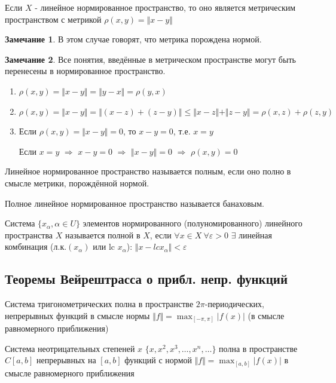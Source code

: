 \documentclass{article}
\theoremstyle{definition}
\numberwithin{theorem}{section}
\numberwithin{lemma}{section}
\numberwithin{definition}{section}
\numberwithin{corollary}{section}
\newtheorem*{remark}{Замечание}
\numberwithin{equation}{section}
\let\epsilon\varepsilon
\let\implies\Rightarrow
\begin{document}
\begin{lemma}
  Если $X$ - линейное нормированное пространство, то оно является
  метрическим пространством с метрикой $\rho(x,y)=\Vert x-y \Vert$
\end{lemma}
\begin{remark}
  В этом случае говорят, что метрика порождена нормой.
\end{remark}
\begin{remark}
  Все понятия, введённые в метрическом пространстве могут быть перенесены в нормированное пространство.
\end{remark}
\begin{definition}
  \phantom{.}

  \begin{enumerate}
    \item $\rho(x,y)=\Vert x-y \Vert=\Vert y-x \Vert=\rho(y,x)$
    \item $\rho(x,y)=\Vert x-y \Vert=\Vert (x-z)+(z-y) \Vert\le \Vert x-z \Vert + \Vert z-y \Vert=\rho(x,z)+\rho(z,y)$
    \item Если $\rho(x,y)=\Vert x-y \Vert=0$, то $x-y=0$, т.е. $x=y$

      Если $x=y$ $\implies$ $x-y=0$ $\implies$ $\Vert x-y \Vert=0$ $\implies $ $\rho(x,y)=0$
  \end{enumerate}
\end{definition}
\begin{definition}
  Линейное нормированное пространство называется полным, если оно полно в смысле
  метрики, порождённой нормой.
\end{definition}
\begin{definition}
  Полное линейное нормированное пространство называется банаховым. 
\end{definition}
\begin{definition}
  Система $\{x_{\alpha}, \alpha \in U\}$ элементов нормированного (полуномированного)
  линейного пространства $X$ называется полной в $X$, если $\forall x \in X\ \forall \epsilon>0$
  $\exists $ линейная комбинация (л.к.$(x_\alpha)$ или lc $x_\alpha$): $\Vert x- lc x_{\alpha}\Vert<\epsilon$
\end{definition}
\subsection{Теоремы Вейрештрасса о прибл. непр. функций}
\begin{theorem}[Т1 с волной]
  Система тригонометрических полна в пространстве $2\pi$-периодических,
  непрерывных функций в смысле нормы $\Vert f \Vert=\max_{[-\pi,\pi]}|f(x)|$
  (в смысле равномерного приближения)
\end{theorem}
\begin{theorem}[Т2 с волной]
  Система неотрицательных степеней $x$ $\{x,x^{2},x^{3},\dots ,x^{n},\dots \}$
  полна в пространстве $C[a,b]$ непрерывных на $[a,b]$ функций с нормой $\Vert f \Vert=\max_{[a,b]}|f(x)|$
  в смысле равномерного приближения
\end{theorem}
\end{document}
